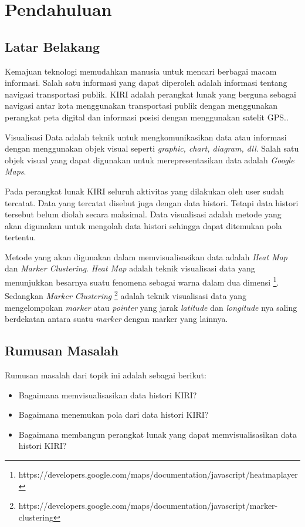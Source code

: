 \chapter{Pendahuluan}
\label{chap:intro}
   
\section{Latar Belakang}
\label{sec:label}

Kemajuan teknologi memudahkan manusia untuk mencari berbagai macam informasi. Salah satu informasi yang dapat diperoleh adalah informasi tentang navigasi transportasi publik. KIRI  adalah perangkat lunak yang berguna sebagai navigasi antar kota menggunakan transportasi publik dengan menggunakan perangkat peta digital dan informasi posisi dengan menggunakan satelit GPS.\cite{pascal:17:kiri}.

Visualisasi Data adalah teknik  untuk mengkomunikasikan data atau informasi dengan menggunakan objek visual  seperti \textit{graphic, chart, diagram, dll}. Salah satu objek visual yang dapat digunakan untuk merepresentasikan data adalah \textit{Google Maps}.

Pada perangkat lunak KIRI seluruh aktivitas yang dilakukan oleh user sudah tercatat. Data yang tercatat disebut juga dengan data histori. Tetapi data histori tersebut belum diolah secara maksimal. Data visualisasi adalah metode yang akan digunakan untuk mengolah data histori sehingga dapat ditemukan pola tertentu.

Metode yang akan digunakan dalam memvisualisasikan data adalah \textit{Heat Map} dan \textit{Marker Clustering}. \textit{Heat Map} adalah teknik visualisasi data yang menunjukkan besarnya suatu fenomena sebagai warna dalam dua dimensi \footnote{https://developers.google.com/maps/documentation/javascript/heatmaplayer}. Sedangkan \textit{Marker Clustering} \footnote{https://developers.google.com/maps/documentation/javascript/marker-clustering}  adalah teknik visualisasi data  yang  mengelompokan \textit{marker} atau \textit{pointer} yang jarak \textit{latitude} dan \textit{longitude} nya saling berdekatan antara suatu \textit{marker} dengan marker yang lainnya.

\section{Rumusan Masalah}
\label{sec:rumusan}
Rumusan masalah dari topik ini adalah sebagai berikut:
\begin{itemize}
  \item Bagaimana memvisualisasikan data histori KIRI?
  \item Bagaimana menemukan pola dari data histori KIRI?
  \item Bagaimana membangun perangkat lunak yang dapat memvisualisasikan data histori KIRI?

\end{itemize}

